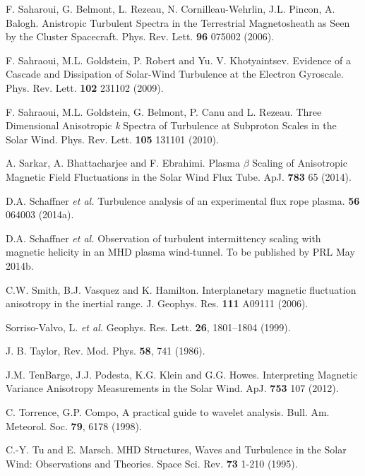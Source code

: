 \documentclass[manuscript]{aastex}
\begin{document}
\begin{thebibliography}{}
 F. Saharoui, G. Belmont, L. Rezeau, N. Cornilleau-Wehrlin, J.L. Pincon, A. Balogh. Anistropic Turbulent Spectra in the Terrestrial Magnetosheath as Seen by the Cluster Spacecraft. Phys. Rev. Lett. {\bf 96} 075002 (2006).

 F. Sahraoui, M.L. Goldstein, P. Robert and Yu. V. Khotyaintsev. Evidence of a Cascade and Dissipation of Solar-Wind Turbulence at the Electron Gyroscale. Phys. Rev. Lett. {\bf 102} 231102 (2009).

 F. Sahraoui, M.L. Goldstein, G. Belmont, P. Canu and L. Rezeau. Three Dimensional Anisotropic {\it k} Spectra of Turbulence at Subproton Scales in the Solar Wind. Phys. Rev. Lett. {\bf 105} 131101 (2010).

A. Sarkar, A. Bhattacharjee and F. Ebrahimi. Plasma $\beta$ Scaling of Anisotropic Magnetic Field Fluctuations in the Solar Wind Flux Tube. ApJ. {\bf 783} 65 (2014).

 D.A. Schaffner {\it et al.} Turbulence analysis of an experimental flux rope plasma. {\bf 56} 064003 (2014a).

 D.A. Schaffner {\it et al.} Observation of turbulent intermittency scaling with magnetic helicity in an MHD plasma wind-tunnel. To be published by PRL May 2014b.

 C.W. Smith, B.J. Vasquez and K. Hamilton. Interplanetary magnetic fluctuation anisotropy in the inertial range. J. Geophys. Res. {\bf 111} A09111 (2006).

Sorriso-Valvo, L. {\it et al.} Geophys. Res. Lett. {\bf 26}, 1801–1804 (1999).

 J. B. Taylor, Rev. Mod. Phys. {\bf 58}, 741 (1986).

 J.M. TenBarge, J.J. Podesta, K.G. Klein and G.G. Howes. Interpreting Magnetic Variance Anisotropy Measurements in the Solar Wind. ApJ. {\bf 753} 107 (2012).

C. Torrence, G.P. Compo, A practical guide to wavelet analysis. Bull. Am. Meteorol. Soc. {\bf 79}, 6178 (1998).

 C.-Y. Tu and E. Marsch. MHD Structures, Waves and Turbulence in the Solar Wind: Observations and Theories. Space Sci. Rev. {\bf 73} 1-210 (1995).


\end{thebibliography}
\end{document}
